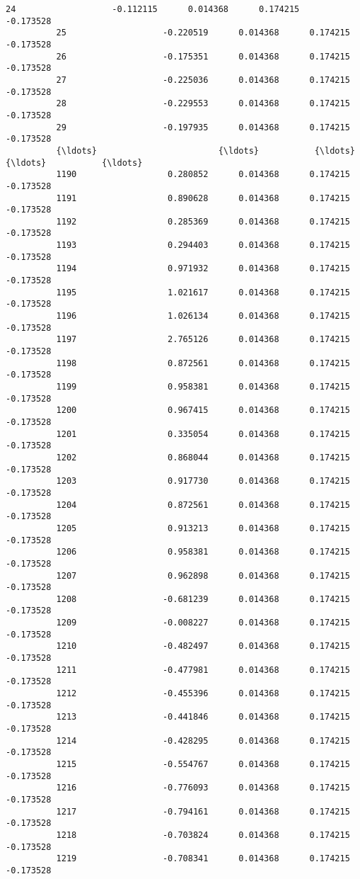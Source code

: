 \documentclass[11pt]{article}
\begin{document}
\begin{Verbatim}[commandchars=\\\{\}]
          24                   -0.112115      0.014368      0.174215     -0.173528   
          25                   -0.220519      0.014368      0.174215     -0.173528   
          26                   -0.175351      0.014368      0.174215     -0.173528   
          27                   -0.225036      0.014368      0.174215     -0.173528   
          28                   -0.229553      0.014368      0.174215     -0.173528   
          29                   -0.197935      0.014368      0.174215     -0.173528   
          {\ldots}                        {\ldots}           {\ldots}           {\ldots}           {\ldots}   
          1190                  0.280852      0.014368      0.174215     -0.173528   
          1191                  0.890628      0.014368      0.174215     -0.173528   
          1192                  0.285369      0.014368      0.174215     -0.173528   
          1193                  0.294403      0.014368      0.174215     -0.173528   
          1194                  0.971932      0.014368      0.174215     -0.173528   
          1195                  1.021617      0.014368      0.174215     -0.173528   
          1196                  1.026134      0.014368      0.174215     -0.173528   
          1197                  2.765126      0.014368      0.174215     -0.173528   
          1198                  0.872561      0.014368      0.174215     -0.173528   
          1199                  0.958381      0.014368      0.174215     -0.173528   
          1200                  0.967415      0.014368      0.174215     -0.173528   
          1201                  0.335054      0.014368      0.174215     -0.173528   
          1202                  0.868044      0.014368      0.174215     -0.173528   
          1203                  0.917730      0.014368      0.174215     -0.173528   
          1204                  0.872561      0.014368      0.174215     -0.173528   
          1205                  0.913213      0.014368      0.174215     -0.173528   
          1206                  0.958381      0.014368      0.174215     -0.173528   
          1207                  0.962898      0.014368      0.174215     -0.173528   
          1208                 -0.681239      0.014368      0.174215     -0.173528   
          1209                 -0.008227      0.014368      0.174215     -0.173528   
          1210                 -0.482497      0.014368      0.174215     -0.173528   
          1211                 -0.477981      0.014368      0.174215     -0.173528   
          1212                 -0.455396      0.014368      0.174215     -0.173528   
          1213                 -0.441846      0.014368      0.174215     -0.173528   
          1214                 -0.428295      0.014368      0.174215     -0.173528   
          1215                 -0.554767      0.014368      0.174215     -0.173528   
          1216                 -0.776093      0.014368      0.174215     -0.173528   
          1217                 -0.794161      0.014368      0.174215     -0.173528   
          1218                 -0.703824      0.014368      0.174215     -0.173528   
          1219                 -0.708341      0.014368      0.174215     -0.173528   
          

\end{Verbatim}
\end{document}
